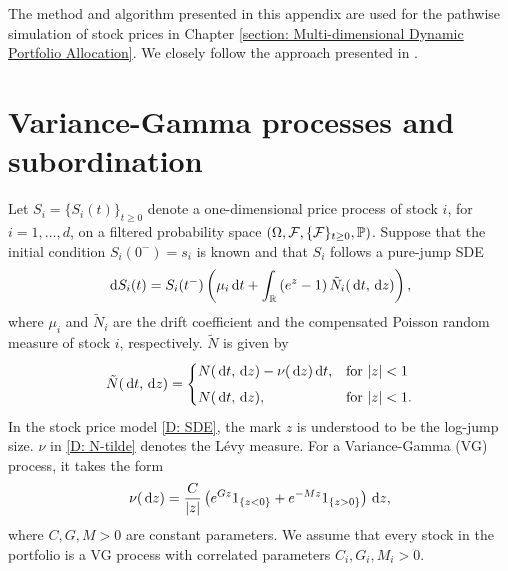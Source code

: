 \label{Appendix: Stock Scenario Generator}

The method and algorithm presented in this appendix are used for the pathwise simulation of stock prices in Chapter \ref{section: Multi-dimensional Dynamic Portfolio Allocation}. We closely follow the approach presented in \cite{LUCIANO20101937, Luciano02072016}.

\section{Variance-Gamma processes and subordination}
Let $S_i=\{S_i(t)\}_{t \geq 0}$ denote a one-dimensional price process of stock $i$, for $i=1,\ldots,d$, on a filtered probability space $(\Omega, \mathcal{F}, \{\mathcal{F}\}_{t \geq 0}, \mathbb{P})$. Suppose that the initial condition $S_i(0^-) = s_i$ is known and that $S_i$ follows a pure-jump SDE
\begin{equation}
    \,\mathrm{d} S_i(t) = S_i(t^-) \left( \mu_i \,\mathrm{d} t + \int_{\mathbb{R}}\left(e^z-1\right) \tilde N_i(\,\mathrm{d} t, \,\mathrm{d} z) \right),
    \label{D: SDE}
\end{equation}
where $\mu_i$ and $\tilde N_i$ are the drift coefficient and the compensated Poisson random measure of stock $i$, respectively. $\tilde N$ is given by
\begin{equation}
    \tilde N(\,\mathrm{d} t, \,\mathrm{d} z) = 
    \begin{cases}
        N(\,\mathrm{d} t, \,\mathrm{d} z) - \nu(\,\mathrm{d} z) \,\mathrm{d} t, & \text{for } |z| < 1 \\[1ex]
        N(\,\mathrm{d} t, \,\mathrm{d} z), & \text{for } |z| < 1.
    \end{cases}
    \label{D: N-tilde}
\end{equation}
In the stock price model \eqref{D: SDE}, the mark $z$ is understood to be the log-jump size. $\nu$ in \eqref{D: N-tilde} denotes the Lévy measure. For a Variance-Gamma (VG) process, it takes the form
\begin{equation*}
    \nu(\,\mathrm{d} z) = \frac{C}{|z|} \left( e^{Gz} 1_{\left\{z<0\right\}} + e^{-Mz} 1_{\left\{z>0\right\}} \right)\,\mathrm{d} z,
\end{equation*}
where $C,G,M > 0$ are constant parameters. We assume that every stock in the portfolio is a VG process with correlated parameters $C_i,G_i,M_i>0$. 

